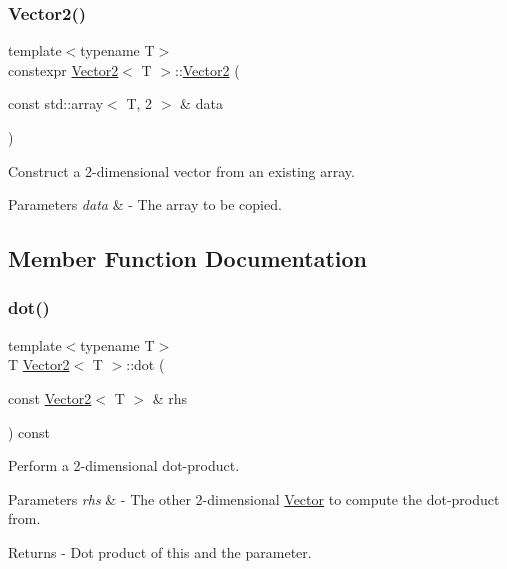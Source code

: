 \subsubsection{\texorpdfstring{Vector2()}{Vector2()}\hspace{0.1cm}{\footnotesize\ttfamily [2/2]}}
{\footnotesize\ttfamily template$<$typename T$>$ \\
constexpr \mbox{\hyperlink{class_vector2}{Vector2}}$<$ T $>$\+::\mbox{\hyperlink{class_vector2}{Vector2}} (\begin{DoxyParamCaption}\item[{const std\+::array$<$ T, 2 $>$ \&}]{data }\end{DoxyParamCaption})}

Construct a 2-\/dimensional vector from an existing array. 
\begin{DoxyParams}{Parameters}
{\em data} & -\/ The array to be copied. \\
\hline
\end{DoxyParams}


\subsection{Member Function Documentation}
\mbox{\label{class_vector2_a9f7a1b36270fa93b51546d2b29228e39}} 
\subsubsection{\texorpdfstring{dot()}{dot()}}
{\footnotesize\ttfamily template$<$typename T$>$ \\
T \mbox{\hyperlink{class_vector2}{Vector2}}$<$ T $>$\+::dot (\begin{DoxyParamCaption}\item[{const \mbox{\hyperlink{class_vector2}{Vector2}}$<$ T $>$ \&}]{rhs }\end{DoxyParamCaption}) const}

Perform a 2-\/dimensional dot-\/product. 
\begin{DoxyParams}{Parameters}
{\em rhs} & -\/ The other 2-\/dimensional \mbox{\hyperlink{class_vector}{Vector}} to compute the dot-\/product from. \\
\hline
\end{DoxyParams}
\begin{DoxyReturn}{Returns}
-\/ Dot product of this and the parameter. 
\end{DoxyReturn}
\mbox{\label{class_vector2_a784391c74b4bd821fc4a6277170c1263}} 
